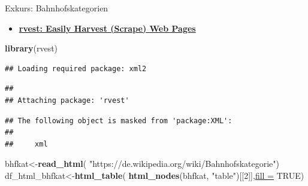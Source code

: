\documentclass[ignorenonframetext,]{beamer}
\newenvironment{Shaded}{\begin{snugshade}}{\end{snugshade}}
\newcommand{\DataTypeTok}[1]{\textcolor[rgb]{0.74,0.68,0.62}{\underline{#1}}}
\newcommand{\DecValTok}[1]{\textcolor[rgb]{0.27,0.67,0.26}{#1}}
\newcommand{\KeywordTok}[1]{\textcolor[rgb]{0.26,0.66,0.93}{\textbf{#1}}}
\newcommand{\NormalTok}[1]{\textcolor[rgb]{0.74,0.68,0.62}{#1}}
\newcommand{\OtherTok}[1]{\textcolor[rgb]{0.74,0.68,0.62}{#1}}
\newcommand{\StringTok}[1]{\textcolor[rgb]{0.02,0.61,0.04}{#1}}
\providecommand{\tightlist}{%
  \setlength{\itemsep}{0pt}\setlength{\parskip}{0pt}}
\begin{document}
\begin{frame}[fragile]{Exkurs: Bahnhofskategorien}
\protect\hypertarget{exkurs-bahnhofskategorien}{}

\begin{itemize}[<+->]
\tightlist
\item
  \href{https://cran.r-project.org/web/packages/rvest/index.html}{\textbf{rvest:
  Easily Harvest (Scrape) Web Pages}}
\end{itemize}

\begin{Shaded}
\begin{Highlighting}[]
\KeywordTok{library}\NormalTok{(rvest)}
\end{Highlighting}
\end{Shaded}

\begin{verbatim}
## Loading required package: xml2
\end{verbatim}

\begin{verbatim}
## 
## Attaching package: 'rvest'
\end{verbatim}

\begin{verbatim}
## The following object is masked from 'package:XML':
## 
##     xml
\end{verbatim}

\begin{Shaded}
\begin{Highlighting}[]
\NormalTok{bhfkat<-}\KeywordTok{read_html}\NormalTok{(}
  \StringTok{"https://de.wikipedia.org/wiki/Bahnhofskategorie"}\NormalTok{)}
\NormalTok{df_html_bhfkat<-}\KeywordTok{html_table}\NormalTok{(}
  \KeywordTok{html_nodes}\NormalTok{(bhfkat, }\StringTok{"table"}\NormalTok{)[[}\DecValTok{2}\NormalTok{]],}\DataTypeTok{fill =} \OtherTok{TRUE}\NormalTok{)}
\end{Highlighting}
\end{Shaded}

\end{frame}
\end{document}
